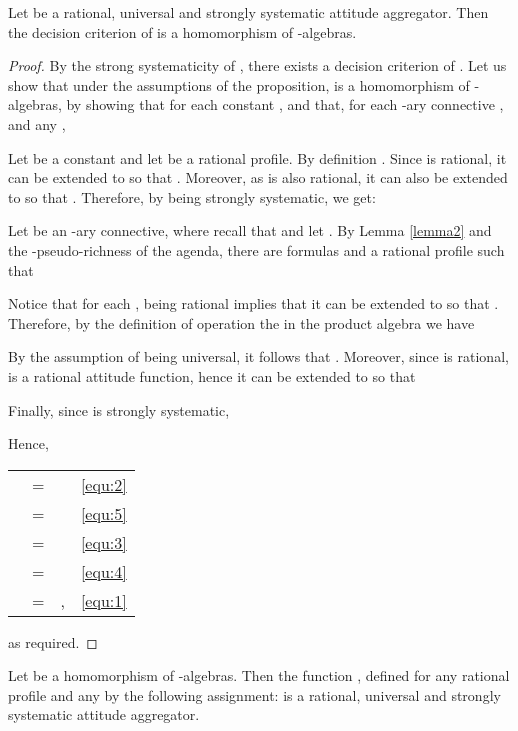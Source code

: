 \documentclass{llncs}
\numberwithin{equation}{section}
\begin{document}
\begin{proposition}\label{prop1}
Let  be a rational, universal and strongly systematic attitude aggregator. Then the decision criterion of  is a homomorphism of -algebras.
\end{proposition}
\begin{proof}

By the strong systematicity of , there exists a decision criterion  of . Let us show that under the assumptions of the proposition,  is a homomorphism of -algebras, by showing that  for each constant , and that, for each -ary connective , and any ,



Let  be a constant and let  be a rational profile. By definition .
Since  is rational, it can be extended to  so that .
Moreover, as  is also rational, it can also be extended to  so that .
Therefore, by  being strongly systematic, we get:


Let  be an -ary connective, where recall that  and  let .
By Lemma \ref{lemma2} and the -pseudo-richness of the agenda, there are formulas  and a rational profile  such that


Notice that for each ,  being rational implies that it can be extended to  so that .
Therefore, by the definition of operation the  in the product algebra  we have


By the assumption of  being universal, it follows that . Moreover, since  is rational,  is a rational attitude function, hence it can be extended to  so that


Finally, since  is strongly systematic,



Hence,

\begin{center}
\begin{tabular}{r c l l}
&=& & \eqref{equ:2}\\
&=&& \eqref{equ:5}\\
&=&& \eqref{equ:3}\\
&=&& \eqref{equ:4}\\
&=&,& \eqref{equ:1}
\end{tabular}
\end{center}

as required.
\end{proof}
\begin{proposition}\label{prop2}
Let  be a homomorphism of -algebras. Then the function , defined for any rational profile  and any  by the following assignment:  is a rational, universal and strongly systematic attitude aggregator.
\end{proposition}
\end{document}
